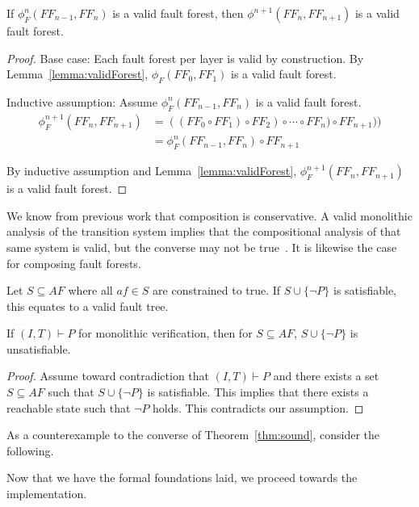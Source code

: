 \begin{theorem} If $\phi_F^n(\mathit{FF}_{n-1}, \mathit{FF}_n)$ is a valid fault forest, then $\phi^{n+1}(\mathit{FF}_{n}, \mathit{FF}_{n+1})$ is a valid fault forest.
\begin{proof}

Base case: Each fault forest per layer is valid by construction. By Lemma~\ref{lemma:validForest}, $\phi_F(\mathit{FF}_{0}, \mathit{FF}_1)$ is a valid fault forest.

Inductive assumption: Assume $\phi_F^n(\mathit{FF}_{n-1}, \mathit{FF}_n)$ is a valid fault forest.
\begin{equation*}
\begin{split}
\phi_F^{n+1}(\mathit{FF}_{n}, \mathit{FF}_{n+1}) &= ((\mathit{FF}_0 \circ \mathit{FF}_1) \circ \mathit{FF}_2) \circ \cdots \circ \mathit{FF}_n) \circ \mathit{FF}_{n+1})) \\
  &= \phi_F^n(\mathit{FF}_{n-1}, \mathit{FF}_n) \circ \mathit{FF}_{n+1}
\end{split}
\end{equation*}


By inductive assumption and Lemma~\ref{lemma:validForest}, $\phi_F^{n+1}(\mathit{FF}_{n}, \mathit{FF}_{n+1})$ is a valid fault forest.

\end{proof}
\label{thm:indForest}
\end{theorem}

We know from previous work that composition is conservative. A valid monolithic analysis of the transition system implies that the compositional analysis of that same system is valid, but the converse may not be true~\cite{}. It is likewise the case for composing fault forests. 

Let $S \subseteq \mathit{AF}$ where all $\mathit{af} \in S$ are constrained to true. If $S \cup \{\neg P\}$ is satisfiable, this equates to a valid fault tree. 

\begin{theorem} If $(I,T) \vdash P$ for monolithic verification, then for $S \subseteq \mathit{AF}$, $S \cup \{\neg P\}$ is unsatisfiable.
\begin{proof}
Assume toward contradiction that $(I,T) \vdash P$ and there exists a set $S \subseteq \mathit{AF}$ such that $S \cup \{\neg P\}$ is satisfiable. This implies that there exists a reachable state such that $\neg P$ holds. This contradicts our assumption. 
\end{proof}
\label{thm:sound}
\end{theorem}

As a counterexample to the converse of Theorem~\ref{thm:sound}, consider the following. 

Now that we have the formal foundations laid, we proceed towards the implementation. 





